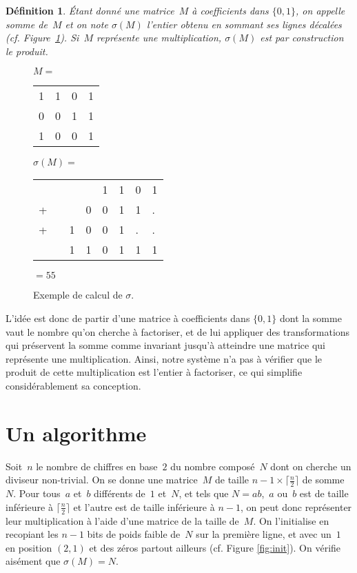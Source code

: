 \documentclass[11pt, openany, a4paper]{article}
\newtheorem*{df*}{ \textbf{Définition}}{}
\begin{document}
\begin{df*}
Étant donné une matrice~$M$ à coefficients dans $\{0,1\}$, on appelle \emph{somme} de~$M$ et on note $\sigma (M)$ l'entier obtenu en sommant ses lignes décalées (cf. Figure~\ref{fig:ExSigma}). Si~$M$ représente une multiplication, $\sigma(M)$ est par construction le produit. 
\end{df*}


\begin{figure}[]
\centering
\begin{minipage}[]{0.3\linewidth}
$M=$
\begin{tabular}{cccc}
1&1&0&1\\
0&0&1&1\\
1&0&0&1\\
\end{tabular}
\end{minipage}
\quad
\begin{minipage}[]{0.6\linewidth}
$\sigma(M)=$
\begin{tabular}{llllllll}
&&&&1&1&0&1\\
+&&&0&0&1&1&.\\
+&&1&0&0&1&.&.\\
\hline
&&1&1&0&1&1&1\\
\end{tabular}
$=55$
\end{minipage}
\caption{Exemple de calcul de $\sigma$.}
\label{fig:ExSigma}
\end{figure}

L'idée est donc de partir d'une matrice à coefficients dans $\{0,1\}$ dont la somme vaut le nombre qu'on cherche à factoriser, et de lui appliquer des transformations qui préservent la somme comme invariant jusqu'à atteindre une matrice qui représente une multiplication. Ainsi, notre système n'a pas à vérifier que le produit de cette multiplication est l'entier à factoriser, ce qui simplifie considérablement sa conception.

\section*{Un algorithme}

Soit~$n$ le nombre de chiffres en base~$2$ du nombre composé~$N$ dont on cherche un diviseur non-trivial. On se donne une matrice~$M$ de taille $ n-1 \times \lceil \frac{n}{2}\rceil$ de somme~$N$. Pour tous~$a$ et~$b$ différents de~$1$ et~$N$, et tels que $N = ab$,~$a$ ou~$b$ est de taille inférieure à $\lceil\frac{n}{2}\rceil$ et l'autre est de taille inférieure à $n-1$, on peut donc représenter leur multiplication à l'aide d'une matrice de la taille de~$M$. On l'initialise en recopiant les $n-1$ bits de poids faible de~$N$ sur la première ligne, et avec un~$1$ en position $(2,1)$ et des zéros partout ailleurs (cf. Figure \ref{fig:init}). On vérifie aisément que $\sigma(M)=N$. 
\end{document}
